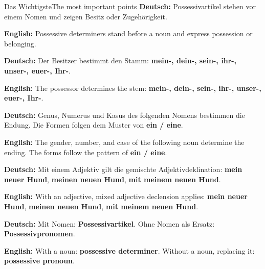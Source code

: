 \documentclass[a4paper,11pt]{article}
\newcommand{\GermanText}[1]{\textbf{Deutsch: }#1\par}
\newcommand{\EnglishText}[1]{{\small\color{SoftGray}\textbf{English: }#1\par}}
\begin{document}
\begin{grammarentry}{Das Wichtigste}{The most important points}
\GermanText{Possessivartikel stehen vor einem Nomen und zeigen Besitz oder Zugehörigkeit.}
\EnglishText{Possessive determiners stand before a noun and express possession or belonging.}

\GermanText{Der Besitzer bestimmt den Stamm: \textbf{mein-, dein-, sein-, ihr-, unser-, euer-, Ihr-}.}
\EnglishText{The possessor determines the stem: \textbf{mein-, dein-, sein-, ihr-, unser-, euer-, Ihr-}.}

\GermanText{Genus, Numerus und Kasus des folgenden Nomens bestimmen die Endung. Die Formen folgen dem Muster von \textbf{ein / eine}.}
\EnglishText{The gender, number, and case of the following noun determine the ending. The forms follow the pattern of \textbf{ein / eine}.}

\GermanText{Mit einem Adjektiv gilt die gemischte Adjektivdeklination: \textbf{mein neuer Hund}, \textbf{meinen neuen Hund}, \textbf{mit meinem neuen Hund}.}
\EnglishText{With an adjective, mixed adjective declension applies: \textbf{mein neuer Hund}, \textbf{meinen neuen Hund}, \textbf{mit meinem neuen Hund}.}

\GermanText{Mit Nomen: \textbf{Possessivartikel}. Ohne Nomen als Ersatz: \textbf{Possessivpronomen}.}
\EnglishText{With a noun: \textbf{possessive determiner}. Without a noun, replacing it: \textbf{possessive pronoun}.}
\end{grammarentry}
\end{document}
